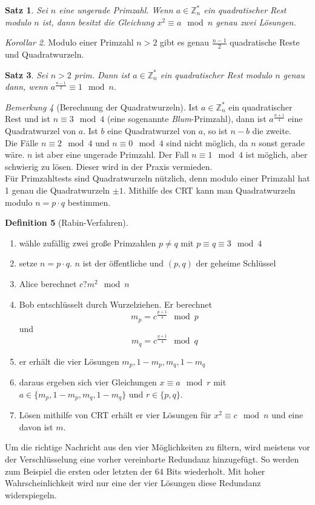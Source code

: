 \documentclass[a4paper, 12pt]{article}
\theoremstyle{plain}
\newtheorem{theorem}{Satz}[subsection] %
\theoremstyle{definition}
\newtheorem{definition}[theorem]{Definition} %
\theoremstyle{lemma}
\theoremstyle{remark}
\newtheorem{remark}[theorem]{Bemerkung}
\theoremstyle{corollary}
\newtheorem{corollary}[theorem]{Korollar}
\theoremstyle{example}
\begin{document}
	\begin{theorem}
		Sei $n$ eine ungerade Primzahl. Wenn $a \in \mathbb{Z}_n^*$ ein quadratischer Rest modulo $n$ ist, dann besitzt die Gleichung $x^2 \equiv a \mod n$ genau zwei Lösungen.
	\end{theorem}
	\begin{corollary}
		Modulo einer Primzahl $n>2$ gibt es genau $\frac{n-1}{2}$ quadratische Reste und Quadratwurzeln.
	\end{corollary}
	\begin{theorem}
		Sei $n>2$ prim. Dann ist $a\in\mathbb{Z}_n^*$ ein quadratischer Rest modulo $n$ genau dann, wenn $a^{\frac{n-1}{2}} \equiv 1 \mod n$.
	\end{theorem}
	\begin{remark}[Berechnung der Quadratwurzeln]
		Ist $a \in \mathbb{Z}_n^*$ ein quadratischer Rest und ist $n \equiv 3 \mod 4$ (eine sogenannte \textit{Blum}-Primzahl), dann ist $a^{\frac{n+1}{4}}$ eine Quadratwurzel von $a$. Ist $b$ eine Quadratwurzel von $a$, so ist $n-b$ die zweite.\\
		Die Fälle $n \equiv 2 \mod 4$ und $n \equiv 0 \mod 4$ sind nicht möglich, da $n$ sonst gerade wäre. $n$ ist aber eine ungerade Primzahl. Der Fall $n \equiv 1 \mod 4$ ist möglich, aber schwierig zu lösen. Dieser wird in der Praxis vermieden.\\
		Für Primzahltests sind Quadratwurzeln nützlich, denn modulo einer Primzahl hat 1 genau die Quadratwurzeln $\pm1$. Mithilfe des CRT kann man Quadratwurzeln modulo $n = p\cdot q$ bestimmen. 
	\end{remark}
	\begin{definition}[Rabin-Verfahren]
		\begin{enumerate}
			\item wähle zufällig zwei große Primzahlen $p\neq q$ mit $p \equiv q \equiv 3 \mod 4$
			\item setze $n=p\cdot q$. $n$ ist der öffentliche und $(p,q)$ der geheime Schlüssel
			\item Alice berechnet $c ? m^2 \mod n$
			\item Bob entschlüsselt durch Wurzelziehen. Er berechnet \[m_p = c^{\frac{p+1}{4}} \mod p\] und \[m_q = c^{\frac{q+1}{4}} \mod q\]
			\item er erhält die vier Lösungen $m_p,1-m_p,m_q,1-m_q$
			\item daraus ergeben sich vier Gleichungen $x \equiv a \mod r$ mit $a \in \{m_p,1-m_p,m_q,1-m_q\}$ und $r \in \{p,q\}$.
			\item Lösen mithilfe von CRT erhält er vier Lösungen für $x^2 \equiv c \mod n$ und eine davon ist $m$.
		\end{enumerate}
		Um die richtige Nachricht aus den vier Möglichkeiten zu filtern, wird meistens vor der Verschlüsselung eine vorher vereinbarte Redundanz hinzugefügt. So werden zum Beispiel die ersten oder letzten der 64 Bits wiederholt. Mit hoher Wahrscheinlichkeit wird nur eine der vier Lösungen diese Redundanz widerspiegeln. 
	\end{definition}
\end{document}
